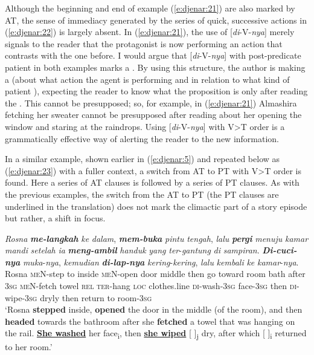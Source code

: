 \documentclass[output=paper
,modfonts
,nonflat]{langsci/langscibook}
\begin{document}
\noindent
Although the beginning and end of example (\ref{e:djenar:21}) are also marked by AT, the sense of immediacy generated by the series of quick, successive actions in (\ref{e:djenar:22}) is largely absent. In (\ref{e:djenar:21}), the use of [\textit{di}-V-\textit{nya}] merely signals to the reader that the protagonist is now performing an action that contrasts with the one before. I would argue that [\textit{di}-V-\textit{nya}] with post-predicate patient in both examples marks a . By using this  structure, the author is making a  (about what action the agent is performing and in relation to what kind of patient ), expecting the reader to know what the proposition is only after reading the . This  cannot be presupposed; so, for example, in (\ref{e:djenar:21}) Almashira fetching her sweater cannot be presupposed after reading about her opening the window and staring at the raindrops. Using [\textit{di}-V-\textit{nya}] with V>T order is a grammatically effective way of alerting the reader to the new information.    

In a similar example, shown earlier in (\ref{e:djenar:5}) and repeated below as (\ref{e:djenar:23}) with a fuller context, a switch from AT to PT with V>T order is found. Here a series of AT clauses is followed by a series of PT clauses. As with the previous examples, the switch from the AT to PT (the PT clauses are underlined in the  translation) does not mark the climactic part of a story episode but rather, a shift in focus. 

\begin{exe}
	\ex\label{e:djenar:23}
	\gll \textit{Rosna} \textbf{\textit{me-langkah}} \textit{ke} \textit{dalam}, \textbf{\textit{mem-buka}} \textit{pintu} \textit{tengah}, \textit{lalu} \textbf{\textit{pergi}} \textit{menuju} \textit{kamar} \textit{mandi} \textit{setelah} \textit{ia} \textbf{\textit{meng-ambil}} \textit{handuk} \textit{yang} \textit{ter}-\textit{gantung} \textit{di} \textit{sampiran}. \textbf{\textit{Di-cuci-nya}} \textit{muka}-\textit{nya}, \textit{kemudian} \textbf{\textit{di-lap-nya}} \textit{kering}-\textit{kering}, \textit{lalu} \textit{kembali} \textit{ke} \textit{kamar}-\textit{nya}.\\
	Rosna \textsc{meN}-step to inside \textsc{meN}-open door middle then go toward room bath after 3\textsc{sg} \textsc{meN}-fetch towel \textsc{rel} \textsc{ter}-hang \textsc{loc} clothes.line \textsc{di}-wash-3\textsc{sg} face-\textsc{3sg} then \textsc{di}-wipe-3\textsc{sg}  dryly then return to room-\textsc{3sg}\\
	\glt ‘Rosna \textbf{stepped} inside, \textbf{opened} the door in the middle (of the room), and then \textbf{headed} towards the bathroom after she \textbf{fetched} a towel that was hanging on the rail. \uline{\textbf{She washed}} her face\textsubscript{i}, then \uline{\textbf{she wiped}} [ ]\textsubscript{j} dry, after which [ ]\textsubscript{i} returned to her room.’ \hfill \citep[119]{Krisna1977}
\end{exe}
\end{document}
